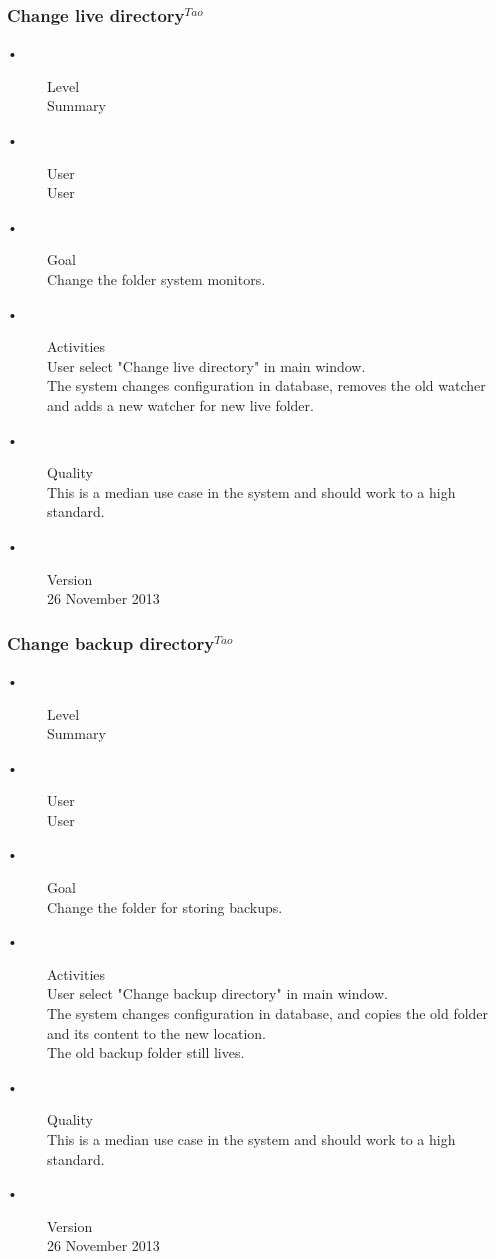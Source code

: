 \documentclass[12pt,a4paper]{article}
\begin{document}
\subsubsection{Change live directory$^{Tao}$}
\begin{description}
	\item[•] Level \hfill \\
	Summary
	\item[•] User \hfill \\
	User
	\item[•] Goal \hfill \\
	Change the folder system monitors.
	\item[•] Activities \hfill \\
	User select "Change live directory" in main window.\\
	The system changes configuration in database, removes the old watcher and adds a new watcher for new live folder.\\
	\item[•] Quality \hfill \\
	This is a median use case in the system and should work to a high standard.
	\item[•] Version \hfill \\
	26 November 2013	
\end{description}
\subsubsection{Change backup directory$^{Tao}$}
\begin{description}
	\item[•] Level \hfill \\
	Summary
	\item[•] User \hfill \\
	User
	\item[•] Goal \hfill \\
	Change the folder for storing backups.
	\item[•] Activities \hfill \\
	User select "Change backup directory" in main window.\\
	The system changes configuration in database, and copies the old folder and its content to the new location.\\
	The old backup folder still lives.
	\item[•] Quality \hfill \\
	This is a median use case in the system and should work to a high standard.
	\item[•] Version \hfill \\
	26 November 2013
\end{description}	
\end{document}
